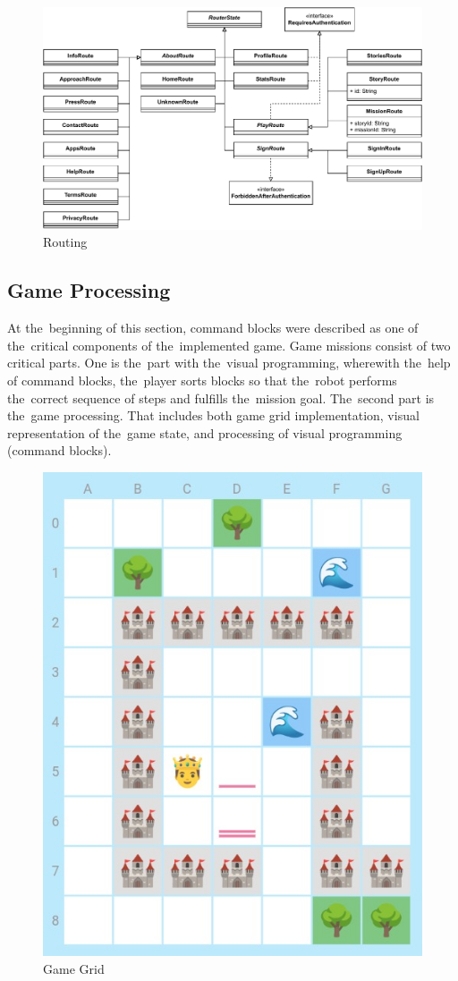 \begin{figure}
    \centering
    \includegraphics[width=1\linewidth]{assets/implementation/routing.pdf}
    \caption{Routing}
    \label{fig:routing}
\end{figure}

\subsection{Game Processing}

At the~beginning of this section, command blocks were described as one of the~critical components of the~implemented game.
Game missions consist of two critical parts.
One is the~part with the~visual programming, wherewith the~help of command blocks, the~player sorts blocks so that the~robot performs the~correct sequence of steps and fulfills the~mission goal.
The~second part is the~game processing.
That includes both game grid implementation, visual representation of the~game state, and processing of visual programming (command blocks).

\begin{figure}
    \centering
    \includegraphics[width=0.5\linewidth]{assets/implementation/gamegrid.jpeg}
    \caption{Game Grid}
    \label{fig:gamegrid}
\end{figure}

